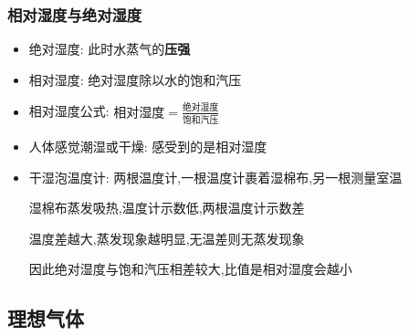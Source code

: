 \documentclass{article}
\begin{document}
\subsubsection{相对湿度与绝对湿度}
\begin{itemize}
    \item 绝对湿度: 此时水蒸气的\textbf{压强}
    \item 相对湿度: 绝对湿度除以水的饱和汽压
    \item 相对湿度公式: $ \text{相对湿度} = \frac{\text{绝对湿度}}{\text{饱和汽压}} $
    \item 人体感觉潮湿或干燥: 感受到的是相对湿度
    \item 干湿泡温度计: 两根温度计,一根温度计裹着湿棉布,另一根测量室温

          \hspace{6.6em} 湿棉布蒸发吸热,温度计示数低,两根温度计示数差

          \hspace{6.6em} 温度差越大,蒸发现象越明显,无温差则无蒸发现象

          \hspace{6.6em} 因此绝对湿度与饱和汽压相差较大,比值是相对湿度会越小
\end{itemize}

\vspace{2em}

\subsection{理想气体}
\end{document}

